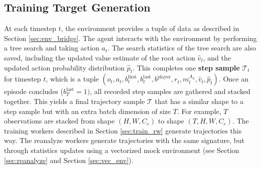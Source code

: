 \subsection{Training Target Generation} \label{sec:targets}
At each timestep $t$, the environment provides a tuple of data as described in Section \ref{sec:env_bridge}.
The agent interacts with the environment by performing a tree search and taking action $a_t$.
The search statistics of the tree search are also saved, including the updated value estimate of the root action $\hat{v}_t$,
and the updated action probability distribution $\hat{p}_t$.
This completes one \textbf{step sample} $\mathcal{T}_t$ for timestep $t$, which is a tuple $(o_t, a_t, b^{\text{first}}_{t}, b^{\text{last}}_{t}, b^{\text{player}}, r_t, m^{A_a}_t, \hat{v}_t, \hat{p}_t)$.
Once an episode concludes ($b^{\text{last}}_{T} = 1)$, all recorded step samples are gathered and stacked together.
This yields a final trajectory sample $\mathcal{T}$ that has a similar shape to a step sample but with an extra batch dimension of size $T$.
For example, $T$ observations are stacked from shape $(H, W, C_e)$ to shape $(T, H, W, C_e)$.
The training workers described in Section \ref{sec:train_rw} generate trajectories this way.
The reanalyze workers generate trajectories with the same signature, but through statistics updates  using a vectorized mock environment (see Section \ref{sec:reanalyze} and Section \ref{sec:vec_env}).

